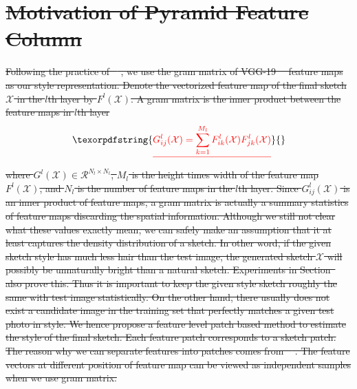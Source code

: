 \documentclass[10pt,twocolumn,letterpaper]{article}
\def\red[#1]{\textcolor{red}{\textbf{#1}}}
\providecommand{\DIFdeltex}[1]{{\protect\color{red}\sout{#1}}}                      %
\providecommand{\DIFdel}[1]{\texorpdfstring{\DIFdeltex{#1}}{}} %
\begin{document}
\section{\DIFdel{Motivation of Pyramid Feature Column}}
\addtocounter{section}{-1}%

\DIFdel{Following the practice of \mbox{%
\cite{gatys2015neural}}%
, we use the gram matrix of VGG-19\mbox{%
\cite{simonyan2014very} }%
feature maps as our style representation. Denote the vectorized feature map of the final sketch $\mathcal{X}$ in the $l$th layer by $F^{l}(\mathcal{X})$. A gram matrix is the inner product between the feature maps in $l$th layer
}\begin{displaymath}
\DIFdel{G^l_{ij}(\mathcal{X}) = \sum \limits_{k=1}^{M_l} F^l_{ik}(\mathcal{X}) F^l_{jk}(\mathcal{X})
\label{eq:Gram_element}
}\end{displaymath}
\DIFdel{where $G^l(\mathcal{X}) \in {\mathcal{R}^{N_l \times N_l}}$, $M_l$ is the height times width of the feature map $F^{l}(\mathcal{X})$, and $N_l$ is the number of feature maps in the $l$th layer. Since $G^l_{ij}(\mathcal{X})$ is an inner product of feature maps, a gram matrix is actually a summary statistics of feature maps discarding the spatial information. Although we still not clear what these values exactly mean, we can safely make an assumption that it at least captures the density distribution of a sketch. In other word, if the given sketch style has much less hair than the test image, the generated sketch $\mathcal{X}$ will possibly be unnaturally bright than a natural sketch. Experiments in Section~}%
\DIFdel{also prove this. 
Thus it is important to keep the given style sketch roughly the same with test image statistically. On the other hand, there usually does not exist a candidate image in the training set that perfectly matches a given test photo in style. We hence propose a feature level patch based method to estimate the style of the final sketch.
Each feature patch corresponds to a sketch patch. The reason why we can separate features into patches comes from \mbox{%
\cite{Li2017Demistify}}%
. The feature vectors at different position of feature map can be viewed as independent samples when we use gram matrix. 
}%
\end{document}
